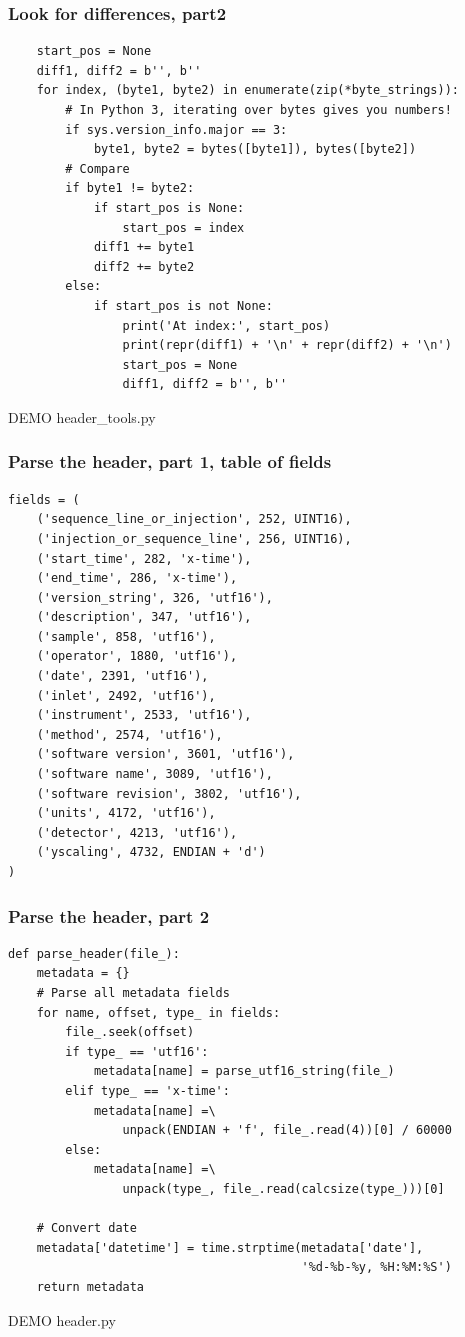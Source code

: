 \documentclass{beamer}
\begin{document}
\begin{frame}[fragile]
  \frametitle{Look for differences, part2}
  \small
  \begin{verbatim}
    start_pos = None
    diff1, diff2 = b'', b''
    for index, (byte1, byte2) in enumerate(zip(*byte_strings)):
        # In Python 3, iterating over bytes gives you numbers!
        if sys.version_info.major == 3:
            byte1, byte2 = bytes([byte1]), bytes([byte2])
        # Compare
        if byte1 != byte2:
            if start_pos is None:
                start_pos = index
            diff1 += byte1
            diff2 += byte2
        else:
            if start_pos is not None:
                print('At index:', start_pos)
                print(repr(diff1) + '\n' + repr(diff2) + '\n')
                start_pos = None
                diff1, diff2 = b'', b''
  \end{verbatim}
  \LARGE DEMO header\_tools.py
\end{frame}

\begin{frame}[fragile]
  \frametitle{Parse the header, part 1, table of fields}
  \small
  \begin{verbatim}
fields = (
    ('sequence_line_or_injection', 252, UINT16),
    ('injection_or_sequence_line', 256, UINT16),
    ('start_time', 282, 'x-time'),
    ('end_time', 286, 'x-time'),
    ('version_string', 326, 'utf16'),
    ('description', 347, 'utf16'),
    ('sample', 858, 'utf16'),
    ('operator', 1880, 'utf16'),
    ('date', 2391, 'utf16'),
    ('inlet', 2492, 'utf16'),
    ('instrument', 2533, 'utf16'),
    ('method', 2574, 'utf16'),
    ('software version', 3601, 'utf16'),
    ('software name', 3089, 'utf16'),
    ('software revision', 3802, 'utf16'),
    ('units', 4172, 'utf16'),
    ('detector', 4213, 'utf16'),
    ('yscaling', 4732, ENDIAN + 'd')
)
  \end{verbatim}
\end{frame}

\begin{frame}[fragile]
  \frametitle{Parse the header, part 2}
  \small
  \begin{verbatim}
def parse_header(file_):
    metadata = {}
    # Parse all metadata fields
    for name, offset, type_ in fields:
        file_.seek(offset)
        if type_ == 'utf16':
            metadata[name] = parse_utf16_string(file_)
        elif type_ == 'x-time':
            metadata[name] =\
                unpack(ENDIAN + 'f', file_.read(4))[0] / 60000
        else:
            metadata[name] =\
                unpack(type_, file_.read(calcsize(type_)))[0]

    # Convert date
    metadata['datetime'] = time.strptime(metadata['date'],
                                         '%d-%b-%y, %H:%M:%S')
    return metadata
  \end{verbatim}
  \LARGE DEMO header.py
\end{frame}
\end{document}
